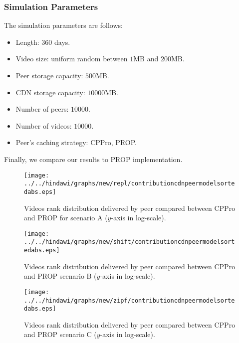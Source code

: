 \subsubsection{Simulation Parameters}
The simulation parameters are follows:
\begin{itemize}
\item Length: $360$ days.
\item Video size: uniform random between $1$MB and $200$MB.
\item Peer storage capacity: $500$MB.
\item CDN storage capacity: $10000$MB.
\item Number of peers: $10000$.
\item Number of videos: $10000$.
\item Peer's caching strategy: CPPro, PROP.
\end{itemize}
Finally, we compare our results to PROP \cite{1613869} implementation.


\begin{figure}[!t]
\begin{center}
\texttt{[image: ../../hindawi/graphs/new/repl/contributioncdnpeermodelsortedabs.eps]}
\end{center}
\caption{Videos rank distribution delivered by peer compared between CPPro and PROP for scenario A ($y$-axis in log-scale).}
\label{fig:contrib-normal}
\end{figure}


\begin{figure}[!t]
\begin{center}
\texttt{[image: ../../hindawi/graphs/new/shift/contributioncdnpeermodelsortedabs.eps]}
\end{center}
\caption{Videos rank distribution delivered by peer compared between CPPro and PROP scenario B ($y$-axis in log-scale).}
\label{fig:contrib-shift}
\end{figure}


\begin{figure}[!t]
\begin{center}
\texttt{[image: ../../hindawi/graphs/new/zipf/contributioncdnpeermodelsortedabs.eps]}
\end{center}
\caption{Videos rank distribution delivered by peer compared between CPPro and PROP scenario C ($y$-axis in log-scale).}
\label{fig:contrib-zipf}
\end{figure}




